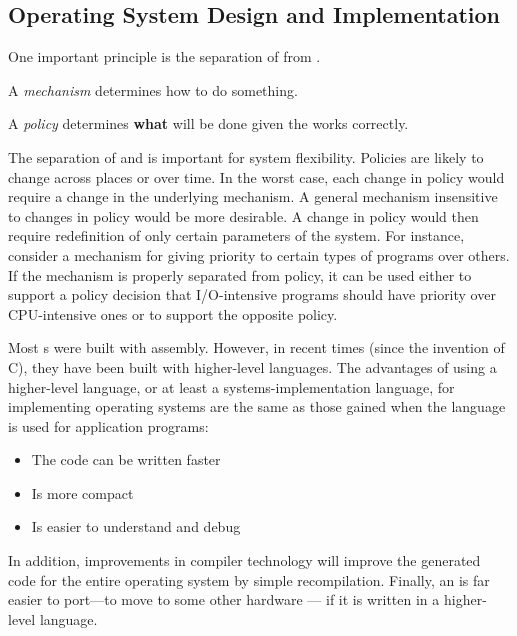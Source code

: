 \subsection{Operating System Design and Implementation}\label{subsec:OS_Design_Implementation}
One important principle is the separation of  from .
\begin{definition}[Mechanism]\label{def:Mechanism}
  A \emph{mechanism} determines how to do something.
\end{definition}

\begin{definition}[Policy]\label{def:Policy}
  A \emph{policy} determines \textbf{what} will be done given the  works correctly.
\end{definition}

The separation of  and  is important for system flexibility.
Policies are likely to change across places or over time.
In the worst case, each change in policy would require a change in the underlying mechanism.
A general mechanism insensitive to changes in policy would be more desirable.
A change in policy would then require redefinition of only certain parameters of the system.
For instance, consider a mechanism for giving priority to certain types of programs over others.
If the mechanism is properly separated from policy, it can be used either to support a policy decision that I/O-intensive programs should have priority over CPU-intensive ones or to support the opposite policy.

Most s were built with assembly.
However, in recent times (since the invention of C), they have been built with higher-level languages.
The advantages of using a higher-level language, or at least a systems-implementation language, for implementing operating systems are the same as those gained when the language is used for application programs:
\begin{itemize}[noitemsep]
\item The code can be written faster
\item Is more compact
\item Is easier to understand and debug
\end{itemize}

In addition, improvements in compiler technology will improve the generated code for the entire operating system by simple recompilation.
Finally, an  is far easier to port—to move to some other hardware —
if it is written in a higher-level language.

